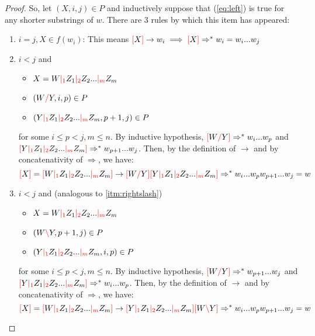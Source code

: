 \documentclass[main.tex]{subfiles}
\begin{document}
\begin{proof}
    So, let $(X, i, j) \in P$ and inductively suppose that (\ref{eq:left}) is true
    for any shorter substrings of $w$. There are 3 rules by which this item has appeared:
    \begin{enumerate}
        \item $i = j, X \in f(w_i)$: This means
            $\textcolor{red}{[} X \textcolor{red}{]} \rightarrow w_i \implies \textcolor{red}{[} X \textcolor{red}{]} \Rightarrow^* w_i = w_i ... w_j$
        \item \label{itm:rightslash} $i < j$ and
            \begin{itemize}
                \item $X = W \textcolor{red}{|_{1}} Z_1 \textcolor{red}{|_{2}} Z_2 ... \textcolor{red}{|_{m}} Z_m$
                \item $(W \textcolor{red}{/} Y, i, p) \in P$
                \item $(Y \textcolor{red}{|_{1}} Z_1 \textcolor{red}{|_{2}} Z_2 ... \textcolor{red}{|_{m}} Z_m, p + 1, j) \in P$
            \end{itemize}
            for some $i \leq p < j, m \leq n$. By inductive hypothesis,
            $\textcolor{red}{[} W \textcolor{red}{/} Y \textcolor{red}{]} \Rightarrow^* w_i ... w_p$
            and
            $\textcolor{red}{[} Y \textcolor{red}{|_{1}} Z_1 \textcolor{red}{|_{2}} Z_2 ... \textcolor{red}{|_{m}} Z_m \textcolor{red}{]} \Rightarrow^* w_{p + 1} ... w_j$.
            Then, by the definition of $\rightarrow$ and by concatenativity of
            $\Rightarrow$, we have:
            \[
                \textcolor{red}{[} X \textcolor{red}{]} = \textcolor{red}{[} W \textcolor{red}{|_{1}} Z_1 \textcolor{red}{|_{2}} Z_2 ... \textcolor{red}{|_{m}} Z_m \textcolor{red}{]}
                \rightarrow
                \textcolor{red}{[} W \textcolor{red}{/} Y \textcolor{red}{]} \textcolor{red}{[} Y \textcolor{red}{|_{1}} Z_1 \textcolor{red}{|_{2}} Z_2 ... \textcolor{red}{|_{m}} Z_m \textcolor{red}{]}
                \Rightarrow^*
                w_i ... w_p w_{p + 1} ... w_j = w
            \]
        \item $i < j$ and (analogous to \ref{itm:rightslash})
            \begin{itemize}
                \item $X = W \textcolor{red}{|_{1}} Z_1 \textcolor{red}{|_{2}} Z_2 ... \textcolor{red}{|_{m}} Z_m$
                \item $(W \textcolor{red}{\backslash} Y, p + 1, j) \in P$
                \item $(Y \textcolor{red}{|_{1}} Z_1 \textcolor{red}{|_{2}} Z_2 ... \textcolor{red}{|_{m}} Z_m, i, p) \in P$
            \end{itemize}
            for some $i \leq p < j, m \leq n$. By inductive hypothesis,
            $\textcolor{red}{[} W \textcolor{red}{/} Y \textcolor{red}{]} \Rightarrow^* w_{p + 1} ... w_j$
            and
            $\textcolor{red}{[} Y \textcolor{red}{|_{1}} Z_1 \textcolor{red}{|_{2}} Z_2 ... \textcolor{red}{|_{m}} Z_m \textcolor{red}{]} \Rightarrow^* w_i ... w_p$.
            Then, by the definition of $\rightarrow$ and by concatenativity of
            $\Rightarrow$, we have:
            \[
                \textcolor{red}{[} X \textcolor{red}{]} = \textcolor{red}{[} W \textcolor{red}{|_{1}} Z_1 \textcolor{red}{|_{2}} Z_2 ... \textcolor{red}{|_{m}} Z_m \textcolor{red}{]}
                \rightarrow
                \textcolor{red}{[} Y \textcolor{red}{|_{1}} Z_1 \textcolor{red}{|_{2}} Z_2 ... \textcolor{red}{|_{m}} Z_m \textcolor{red}{]} \textcolor{red}{[} W \textcolor{red}{\backslash} Y \textcolor{red}{]}
                \Rightarrow^*
                w_i ... w_p w_{p + 1} ... w_j = w
            \]
    \end{enumerate}
\end{proof}
\end{document}

